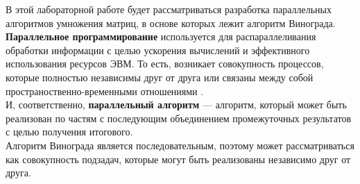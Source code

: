 В этой лабораторной работе будет рассматриваться разработка параллельных алгоритмов умножения матриц, в основе которых лежит алгоритм Винограда. \\

\textbf{Параллельное программирование} используется для распараллеливания обработки информации с целью ускорения вычислений и эффективного использования ресурсов ЭВМ. То есть, возникает совокупность процессов, которые полностью независимы друг от друга или связаны между собой пространоственно-временными отношениями \cite{Paral_methods}. \\ 

И, соответственно, \textbf{параллельный алгоритм} --- алгоритм, который может быть реализован по частям с последующим объединением промежуточных результатов с целью получения итогового.\\

Алгоритм Винограда является последовательным, поэтому может рассматриваться как совокупность подзадач, которые могут быть реализованы независимо друг от друга. 